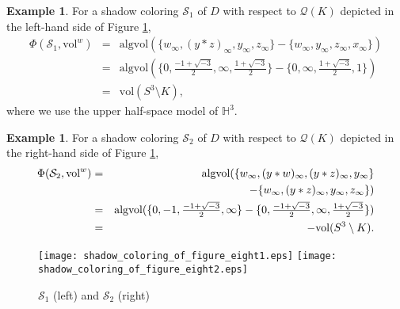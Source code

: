 \documentclass[12pt]{amsart}
\theoremstyle{definition}
\newtheorem{example}[theorem]{Example}
\begin{document}
\begin{example}
For a shadow coloring $\mathcal{S}_{1}$ of $D$ with respect to $\mathcal{Q}(K)$ depicted in the left-hand side of Figure \ref{fig:shadow_coloring_of_figure_eight12},
\begin{eqnarray*}
 \Phi(\mathcal{S}_{1}, \mathrm{vol}^{w}) & = & \mathrm{algvol}(\{ w_{\infty}, (y \ast z)_{\infty}, y_{\infty}, z_{\infty} \} - \{ w_{\infty}, y_{\infty}, z_{\infty}, x_{\infty} \}) \\
 & = & \mathrm{algvol}(\{ 0, \tfrac{-1 + \sqrt{-3}}{2}, \infty, \tfrac{1 + \sqrt{-3}}{2} \} - \{ 0, \infty, \tfrac{1 + \sqrt{-3}}{2}, 1 \}) \\
 & = & \mathrm{vol}(S^{3} \setminus K),
\end{eqnarray*}
where we use the upper half-space model of $\mathbb{H}^{3}$.
\end{example}

\begin{example}
For a shadow coloring $\mathcal{S}_{2}$ of $D$ with respect to $\mathcal{Q}(K)$ depicted in the right-hand side of Figure \ref{fig:shadow_coloring_of_figure_eight12},
\begin{eqnarray*}
 \Phi(\mathcal{S}_{2}, \mathrm{vol}^{w}) & = & \mathrm{algvol}(\{ w_{\infty}, (y \ast w)_{\infty}, (y \ast z)_{\infty}, y_{\infty} \} \\
 & & \hskip 6em - \{ w_{\infty}, (y \ast z)_{\infty}, y_{\infty}, z_{\infty} \}) \\
 & = & \mathrm{algvol}(\{ 0, -1, \tfrac{-1 + \sqrt{-3}}{2}, \infty \} - \{ 0, \tfrac{-1 + \sqrt{-3}}{2}, \infty, \tfrac{1 + \sqrt{-3}}{2} \}) \\
 & = & - \mathrm{vol}(S^{3} \setminus K).
\end{eqnarray*}
\end{example}

\begin{figure}[htb]
\begin{center}
\texttt{[image: shadow\_coloring\_of\_figure\_eight1.eps]} \qquad \qquad
\texttt{[image: shadow\_coloring\_of\_figure\_eight2.eps]}
\end{center}
\caption{$\mathcal{S}_{1}$ (left) and $\mathcal{S}_{2}$ (right)}
\label{fig:shadow_coloring_of_figure_eight12}
\end{figure}
\end{document}

